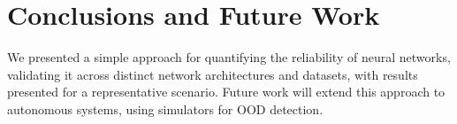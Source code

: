 
\section{Conclusions and Future Work}

We presented a simple approach for quantifying the reliability of neural networks, validating it across distinct network architectures and datasets, with results presented for a representative scenario. Future work will extend this approach to autonomous systems, using simulators for OOD detection.





